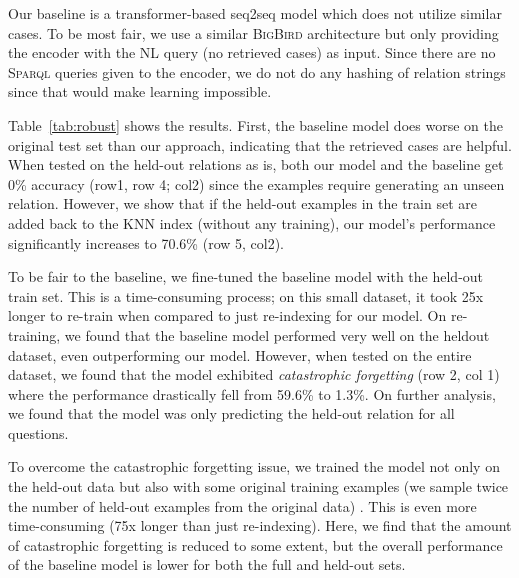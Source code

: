 \documentclass{article}
\newcommand{\bigb}{\textsc{BigBird}\xspace}
\newcommand{\spql}{\textsc{Sparql}\xspace}
\begin{document}
Our baseline is a transformer-based seq2seq model which does not utilize similar cases. To be most fair, we use a similar \bigb architecture but only providing the encoder with the NL query (no retrieved cases) as input. Since there are no \spql queries given to the encoder, we do not do any hashing of relation strings since that would make learning impossible. 


Table~\ref{tab:robust} shows the results. First, the baseline model does worse on the original test set than our approach, indicating that the retrieved cases are helpful. When tested on the held-out relations as is, both our model and the baseline get 0\% accuracy (row1, row 4; col2) since the examples require generating an unseen relation. However, we show that if the held-out examples in the train set are added back to the KNN index (without any training), our model's performance significantly increases to 70.6\% (row 5, col2). 

To be fair to the baseline, we fine-tuned the baseline model with the held-out train set. This is a time-consuming process; on this small dataset, it took 25x longer to re-train when compared to just re-indexing for our model. On re-training, we found that the baseline model performed very well on the heldout dataset, even outperforming our model. However, when tested on the entire dataset, we found that the model exhibited \emph{catastrophic forgetting} \cite{kirkpatrick2017overcoming} (row 2, col 1) where the performance drastically fell from 59.6\% to 1.3\%. On further analysis, we found that the model was only predicting the held-out relation for all questions.

To overcome the catastrophic forgetting issue, we trained the model not only on the held-out data but also with some original training examples (we sample twice the number of held-out examples from the original data) . This is even more time-consuming (75x longer than just re-indexing). Here, we find that the amount of catastrophic forgetting is reduced to some extent, but the overall performance of the baseline model is lower for both the full and held-out sets.
\end{document}
